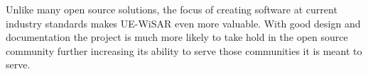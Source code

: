 \documentclass[12pt]{IEEEtran}
\begin{document}
Unlike many open source solutions, the focus of creating software at current
industry standards makes UE-WiSAR even more valuable.  With good design and
documentation the project is much more likely to take hold in the open source
community further increasing its ability to serve those communities it is meant
to serve.


% 

\newpage

\nocite{*}

\end{document}
